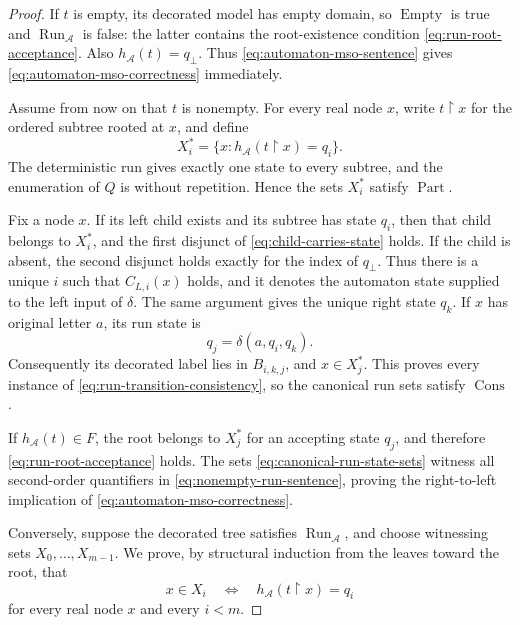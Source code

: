 \documentclass[11pt]{article}
\theoremstyle{definition}
\newcommand{\Aut}{\mathcal A}
\begin{document}
\begin{proof}
If \(t\) is empty, its decorated model has empty domain, so
\(\operatorname{Empty}\) is true and \(\operatorname{Run}_\Aut\) is false:
the latter contains the root-existence condition
\eqref{eq:run-root-acceptance}.  Also \(h_\Aut(t)=q_\bot\).  Thus
\eqref{eq:automaton-mso-sentence} gives
\eqref{eq:automaton-mso-correctness} immediately.

Assume from now on that \(t\) is nonempty.  For every real node \(x\), write
\(t\mathbin{\upharpoonright}x\) for the ordered subtree rooted at \(x\), and
define
\begin{equation}
\label{eq:canonical-run-state-sets}
  X_i^*=
  \{x:h_\Aut(t\mathbin{\upharpoonright}x)=q_i\}.
\end{equation}
The deterministic run gives exactly one state to every subtree, and the
enumeration of \(Q\) is without repetition.  Hence the sets \(X_i^*\) satisfy
\(\operatorname{Part}\).

Fix a node \(x\).  If its left child exists and its subtree has state \(q_i\),
then that child belongs to \(X_i^*\), and the first disjunct of
\eqref{eq:child-carries-state} holds.  If the child is absent, the second
disjunct holds exactly for the index of \(q_\bot\).  Thus there is a unique
\(i\) such that \(C_{L,i}(x)\) holds, and
it denotes the automaton state supplied to the left input of \(\delta\).
The same argument gives the unique right state \(q_k\).  If \(x\) has original
letter \(a\), its run state is
\[
  q_j=\delta(a,q_i,q_k).
\]
Consequently its decorated label lies in \(B_{i,k,j}\), and
\(x\in X_j^*\).  This proves every instance of
\eqref{eq:run-transition-consistency}, so the canonical run sets satisfy
\(\operatorname{Cons}\).

If \(h_\Aut(t)\in F\), the root belongs to \(X_j^*\) for an accepting state
\(q_j\), and therefore \eqref{eq:run-root-acceptance} holds.  The sets
\eqref{eq:canonical-run-state-sets} witness all second-order quantifiers in
\eqref{eq:nonempty-run-sentence}, proving the right-to-left implication of
\eqref{eq:automaton-mso-correctness}.

Conversely, suppose the decorated tree satisfies
\(\operatorname{Run}_\Aut\), and choose witnessing sets
\(X_0,\ldots,X_{m-1}\).  We prove, by structural induction from the leaves
toward the root, that
\begin{equation}
\label{eq:run-state-uniqueness}
  x\in X_i
  \quad\Longleftrightarrow\quad
  h_\Aut(t\mathbin{\upharpoonright}x)=q_i
\end{equation}
for every real node \(x\) and every \(i<m\).


\end{proof}
\end{document}
